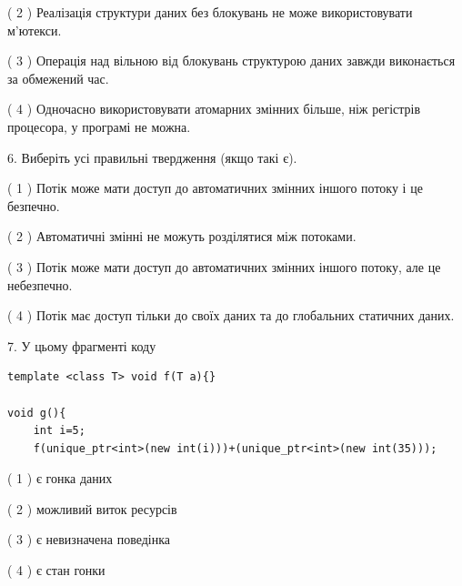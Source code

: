 \documentclass[12pt, ukrainian]{article}
\begin{document}
\begin {large}
{( 2 ) Реалізація структури даних без блокувань не може використовувати м’ютекси.%

( 3 ) Операція над вільною від блокувань структурою даних завжди виконається за обмежений час.%

( 4 ) Одночасно використовувати атомарних змінних більше, ніж регістрів процесора, у програмі не можна.%
\newpage



\vspace{5mm}
6. Виберіть усі правильні твердження (якщо такі є).\par
\vspace{2mm}

( 1 ) Потік може мати доступ до автоматичних змінних іншого потоку і це безпечно.%

( 2 ) Автоматичні змінні не можуть розділятися між потоками.%

( 3 ) Потік може мати доступ до автоматичних змінних іншого потоку, але це небезпечно.%

( 4 ) Потік має доступ тільки до своїх даних та до глобальних статичних даних.%


\vspace{5mm}
7. У цьому фрагменті коду
\begin{verbatim}
template <class T> void f(T a){}

void g(){
    int i=5;
    f(unique_ptr<int>(new int(i)))+(unique_ptr<int>(new int(35)));
\end{verbatim}
( 1 ) є гонка даних%

( 2 ) можливий виток ресурсів%

( 3 ) є невизначена поведінка%

( 4 ) є стан гонки%
}
\end {large}
\end{document}
